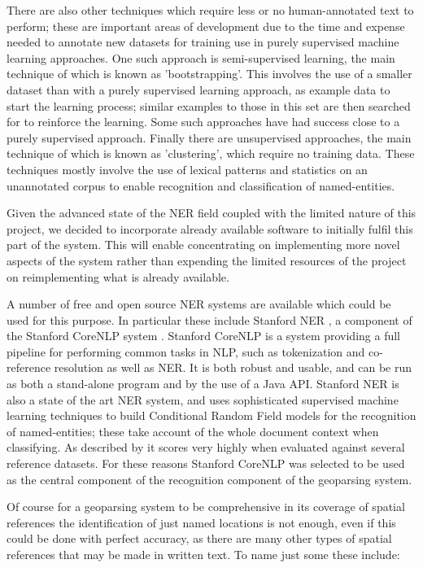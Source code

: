\documentclass[12pt, a4paper]{report}
\begin{document}
There are also other techniques which require less or no human-annotated text to perform; these are important areas of development due to the time and expense needed to annotate new datasets for training use in purely supervised machine learning approaches. One such approach is semi-supervised learning, the main technique of which is known as 'bootstrapping'. This involves the use of a smaller dataset than with a purely supervised learning approach, as example data to start the learning process; similar examples to those in this set are then searched for to reinforce the learning. Some such approaches have had success close to a purely supervised approach. Finally there are unsupervised approaches, the main technique of which is known as 'clustering', which require no training data. These techniques mostly involve the use of lexical patterns and statistics on an unannotated corpus to enable recognition and classification of named-entities.

Given the advanced state of the NER field coupled with the limited nature of this project, we decided to incorporate already available software to initially fulfil this part of the system. This  will enable concentrating on implementing more novel aspects of the system rather than expending the limited resources of the project on reimplementing what is already available.

A number of free and open source NER systems are available which could be used for this purpose. In particular these include Stanford NER \citep{finkel2005}, a component of the Stanford CoreNLP system \cite{manning2014}. Stanford CoreNLP is a system providing a full pipeline for performing common tasks in NLP, such as tokenization and co-reference resolution as well as NER. It is both robust and usable, and can be run as both a stand-alone program and by the use of a Java API. Stanford NER is also a state of the art NER system, and uses sophisticated supervised machine learning techniques to build Conditional Random Field models for the recognition of named-entities; these take account of the whole document context when classifying. As described by \citet{finkel2005} it scores very highly when evaluated against several reference datasets. For these reasons Stanford CoreNLP was selected to be used as the central component of the recognition component of the geoparsing system.

Of course for a geoparsing system to be comprehensive in its coverage of spatial references the identification of just named locations is not enough, even if this could be done with perfect accuracy, as there are many other types of spatial references that may be made in written text. To name just some these include:
\end{document}
